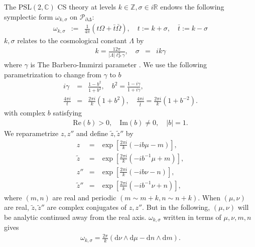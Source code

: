 \documentclass[aps,prd,notitlepage,nofootinbib,superscriptaddress,groupedaddress,twocolumn]{revtex4-1}
\def\R{\mathbb{R}}
\newcommand{\PSlc}{\mathrm{PSL}(2,\mathbb{C})}
\def\be{\begin{eqnarray}}
\def\ee{\end{eqnarray}}
\newcommand{\calp}{\mathcal P}
\newcommand{\g}{\gamma}
\newcommand{\sig}{\sigma}
\renewcommand{\L }{\Lambda}
\renewcommand{\o}{\omega}
\newcommand{\rmd}{\mathrm d}
\newcommand{\lt}{\left}
\newcommand{\rt}{\right}
\begin{document}
The $\PSlc$ CS theory at levels $k\in \mathbb{Z},\sig\in i\R$ endows the following symplectic form $\o_{k,\sig}$ on $\calp_{\partial\Delta}$:
\be
\omega_{k, \sigma}&:=&\frac{1}{4 \pi}(t \Omega+\bar{t} \bar{\Omega}), \quad t:=k+\sigma, \quad \bar{t}:=k-\sigma%
\ee
$k,\sig$ relates to the cosmological constant $\L$ by 
\be
k=\frac{12\pi}{|\L|\ell_P^2\g},\quad \sig&=&ik\g\label{kandLambda}
\ee
where $\g$ is The Barbero-Immirzi parameter \cite{HHKR}. We use the following parametrization to change from $\g$ to $b$ \cite{levelk} 
\be
i \g&=&\frac{1-b^2}{1+b^2},\quad b^2=\frac{1-i \gamma }{1+i \gamma },\\
\frac{4 \pi i}{t}&=&\frac{2 \pi i}{k}\left(1+b^{2}\right), \quad \frac{4 \pi i}{\bar{t}}=\frac{2 \pi i}{k}\left(1+b^{-2}\right) .
\ee
with complex $b$ satisfying 
\be
\mathrm{Re}(b)>0, \quad\mathrm{Im}(b)\neq 0, \quad |b|=1.
\ee	
We reparametrize $z,z''$ and define $\widetilde{z},\widetilde{z}''$ by 
\be
z&=&\exp \lt[\frac{2 \pi i}{k}(-i b \mu-m)\rt], \\
\widetilde{z}&=&\exp \lt[\frac{2 \pi i}{k}\left(-i b^{-1} \mu+m\right)\rt], \label{zbarz}\\
z''&=&\exp \lt[\frac{2 \pi i}{k}(-i b \nu-n)\rt], \\
\widetilde{z}''&=&\exp \lt[ \frac{2 \pi i}{k}\left(-i b^{-1} \nu+n\right)\rt],\label{zbarzpp}
\ee
where $(m,n)$ are real and periodic $(m\sim m+k,n\sim n+k)$. When $(\mu,\nu)$ are real, $\widetilde{z},\widetilde{z}''$ are complex conjugates of $z,z''$. But in the following, $(\mu,\nu)$ will be analytic continued away from the real axis. %
$\omega_{k, \sigma}$ written in terms of $\mu,\nu, m, n$ gives
\be
\omega_{k, \sigma}=\frac{2 \pi}{k}(\rmd \nu \wedge \rmd \mu-\rmd n \wedge \rmd m).
\ee
	
\end{document}
